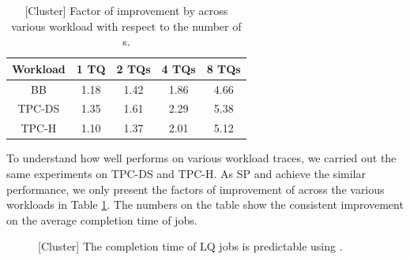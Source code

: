 \begin{table}[!t]
\centering
\caption{[Cluster] Factor of improvement by \name across various workload with respect to the number of {\batchq}s.} 
\begin{tabular}{|c|c|c|c|c|} \hline
\small
\centering
Workload & 1 TQ  & 2 TQs & 4 TQs & 8 TQs \\ \hline \hline
BB & 1.18 & 1.42 & 1.86 & 4.66 \\ \hline 
TPC-DS &  1.35 &   1.61  &  2.29  &  5.38  \\ \hline 
TPC-H & 1.10  & 1.37 & 2.01 &  5.12\\ \hline 
\end{tabular}
\label{tbl:speed_up}
\end{table}

To understand how well \name performs on various workload traces, we carried out the same experiments on TPC-DS and TPC-H.
As SP and \name achieve the similar performance, we only present the factors of improvement of \name across the various workloads in Table \ref{tbl:speed_up}.
The numbers on the table show the consistent improvement on the average completion time of \burstq jobs. 

\begin{figure}[!t]
    \centering
    \caption{[Cluster] The completion time of LQ jobs is predictable using \name.}
    \label{fig:busty_perf_grt_cdf}
    \vspace{-0.4cm}
\end{figure}

